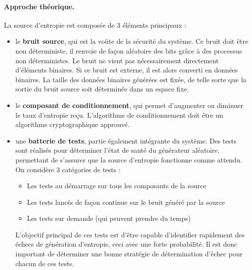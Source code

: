 \paragraph{Approche théorique.\\}
La source d'entropie est composée de 3 éléments principaux : 
\begin{itemize}
\item le \textbf{bruit source}, qui est la voûte de la sécurité du système. Ce bruit doit être non déterministe, il renvoie de façon aléatoire des bits grâce à des processus non déterministes. Le bruit ne vient pas nécessairement directement d'éléments binaires. Si ce bruit est externe, il est alors converti en données binaires. La taille des données binaires générées est fixée, de telle sorte que la sortie du bruit source soit déterminée dans un espace fixe.
\item le \textbf{composant de conditionnement}, qui permet d'augmenter ou diminuer le taux d'entropie reçu. L'algorithme de conditionnement doit être un algorithme cryptographique approuvé.
\item une \textbf{batterie de tests}, partie également intégrante du système. Des tests sont réalisés pour déterminer l'état de santé du générateur aléatoire, permettant de s'assurer que la source d'entropie fonctionne comme attendu. On considère 3 catégories de tests : 
	\begin{itemize}
	\item Les tests au démarrage sur tous les composants de la source
	\item Les tests lancés de façon continue sur le bruit généré par la source
	\item Les tests sur demande (qui peuvent prendre du temps)
	\end{itemize}
	L'objectif principal de ces tests est d'être capable d'identifier rapidement des échecs de génération d'entropie, ceci avec une forte probabilité. Il est donc important de déterminer une bonne stratégie de détermination d'échec pour chacun de ces tests.\\
\end{itemize}

